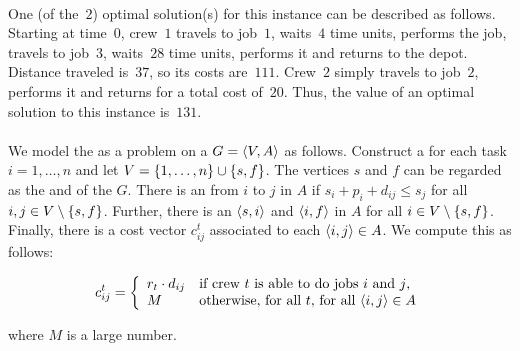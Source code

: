 \paragraph{}
One (of the~$2$) optimal solution(s) for this instance can be described as follows. Starting at time~$0$, crew~$1$ travels to job~$1$, waits~$4$ time units, performs the job, travels to job~$3$, waits~$28$ time units, performs it and returns to the depot. Distance traveled is~$37$, so its costs are~$111$. Crew~$2$ simply travels to job~$2$, performs it and returns for a total cost of~$20$. Thus, the value of an optimal solution to this instance is~$131$.

\paragraph{}
We model the  as a problem on a  $G=\left\langle V,A \right\rangle$ as follows. Construct a  for each task $i=1,\ldots,n$ and let $V=\left\{ 1,\ldots,n \right\}\cup\left\{ s,f \right\}$. The vertices $s$ and $f$ can be regarded as the  and  of the  $G$. There is an  from  $i$ to $j$ in $A$ if $s_i+p_i+d_{ij}\leq s_j$ for all $i,j\in V\setminus\left\{ s,f \right\}$. Further, there is an  $\left\langle s,i \right\rangle$ and $\left\langle i,f \right\rangle$ in $A$ for all $i\in V\setminus\left\{ s,f \right\}$. Finally, there is a cost vector $c_{ij}^t$ associated to each  $\left\langle i,j \right\rangle\in A$. We compute this  as follows:

\begin{equation}
\semvalvar{c_{ij}^t}{r_t\cdot d_{ij}}{if crew $t$ is able to do jobs $i$ and $j$,}{M}{otherwise, for all $t$, for all $\tupl{i,j}\in A$}
\eqnlab{semcijt}
\end{equation}

where $M$ is a large number.

